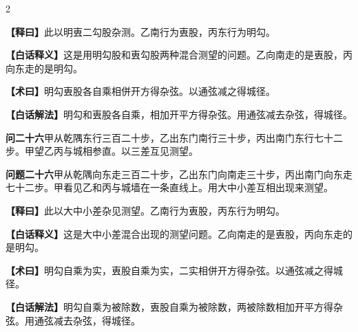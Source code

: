\documentclass[11pt,a4paper]{article}
\newcommand{\WenQuestion}[1]{\textbf{\textcolor{classicalcolor}{#1}}}
\newcommand{\BaiQuestion}[1]{\textbf{\textcolor{moderncolor}{#1}}}
\newcommand{\WenExplain}{\textcolor{classicalcolor}{\textbf{【释曰】}}}
\newcommand{\BaiExplain}{\textcolor{moderncolor}{\textbf{【白话释义】}}}
\newcommand{\WenMethod}{\textcolor{classicalcolor}{\textbf{【术曰】}}}
\newcommand{\BaiMethod}{\textcolor{moderncolor}{\textbf{【白话解法】}}}
\begin{document}
\begin{paracol}{2}
\switchcolumn*
\begin{tcolorbox}[colback=red!5,colframe=red!30!black,boxrule=0.3pt]
\WenExplain\quad 此以明叀二勾股杂测。乙南行为叀股，丙东行为明勾。
\end{tcolorbox}
\switchcolumn
\begin{tcolorbox}[colback=blue!5,colframe=blue!30!black,boxrule=0.3pt]
\BaiExplain\quad 这是用明勾股和叀勾股两种混合测望的问题。乙向南走的是叀股，丙向东走的是明勾。
\end{tcolorbox}

\switchcolumn*
\begin{tcolorbox}[colback=red!5,colframe=red!40!black,boxrule=0.3pt]
\WenMethod\quad 明勾叀股各自乘相併开方得杂弦。以通弦减之得城径。
\end{tcolorbox}
\switchcolumn
\begin{tcolorbox}[colback=blue!5,colframe=blue!40!black,boxrule=0.3pt]
\BaiMethod\quad 明勾和叀股各自乘，相加开平方得杂弦。用通弦减去杂弦，得城径。
\end{tcolorbox}

\vspace{0.8em}

\switchcolumn*
\begin{tcolorbox}[colback=red!3,colframe=red!30!black,boxrule=0.3pt]
\WenQuestion{问二十六}\quad 甲从乾隅东行三百二十步，乙出东门南行三十步，丙出南门东行七十二步。甲望乙丙与城相参直。以三差互见测望。
\end{tcolorbox}
\switchcolumn
\begin{tcolorbox}[colback=blue!3,colframe=blue!30!black,boxrule=0.3pt]
\BaiQuestion{问题二十六}\quad 甲从乾隅向东走三百二十步，乙出东门向南走三十步，丙出南门向东走七十二步。甲看见乙和丙与城墙在一条直线上。用大中小差互相出现来测望。
\end{tcolorbox}

\switchcolumn*
\begin{tcolorbox}[colback=red!5,colframe=red!30!black,boxrule=0.3pt]
\WenExplain\quad 此以大中小差杂见测望。乙南行为叀股，丙东行为明勾。
\end{tcolorbox}
\switchcolumn
\begin{tcolorbox}[colback=blue!5,colframe=blue!30!black,boxrule=0.3pt]
\BaiExplain\quad 这是大中小差混合出现的测望问题。乙向南走的是叀股，丙向东走的是明勾。
\end{tcolorbox}

\switchcolumn*
\begin{tcolorbox}[colback=red!5,colframe=red!40!black,boxrule=0.3pt]
\WenMethod\quad 明勾自乘为实，叀股自乘为实，二实相併开方得杂弦。以通弦减之得城径。
\end{tcolorbox}
\switchcolumn
\begin{tcolorbox}[colback=blue!5,colframe=blue!40!black,boxrule=0.3pt]
\BaiMethod\quad 明勾自乘为被除数，叀股自乘为被除数，两被除数相加开平方得杂弦。用通弦减去杂弦，得城径。
\end{tcolorbox}


\end{paracol}
\end{document}
